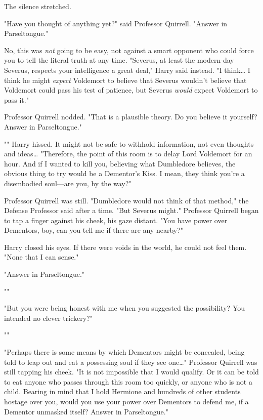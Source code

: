 The silence stretched.

"Have you thought of anything yet?" said Professor Quirrell. "Answer in
Parseltongue."

No, this was \emph{not} going to be easy, not against a smart opponent who
could force you to tell the literal truth at any time. "Severus, at least the
modern-day Severus, respects your intelligence a great deal," Harry said
instead. "I think{\ldots} I think he might \emph{expect} Voldemort to believe
that Severus wouldn't believe that Voldemort could pass his test of patience,
but Severus \emph{would} expect Voldemort to pass it."

Professor Quirrell nodded. "That is a plausible theory. Do you believe it
yourself? Answer in Parseltongue."

"" Harry hissed. It might not be safe to withhold information, not
even thoughts and ideas{\ldots} "Therefore, the point of this room is to delay
Lord Voldemort for an hour. And if I wanted to kill you, believing what
Dumbledore believes, the obvious thing to try would be a Dementor's Kiss. I
mean, they think you're a disembodied soul---are you, by the way?"

Professor Quirrell was still. "Dumbledore would not think of that method," the
Defense Professor said after a time. "But Severus might." Professor Quirrell
began to tap a finger against his cheek, his gaze distant. "You have power over
Dementors, boy, can you tell me if there are any nearby?"

Harry closed his eyes. If there were voids in the world, he could not feel
them. "None that I can sense."

"Answer in Parseltongue."

""

"But you were being honest with me when you suggested the possibility? You
intended no clever trickery?"

""

"Perhaps there is some means by which Dementors might be concealed, being told
to leap out and eat a possessing soul if they see one{\ldots}" Professor
Quirrell was still tapping his cheek. "It is not impossible that I would
qualify. Or it can be told to eat anyone who passes through this room too
quickly, or anyone who is not a child. Bearing in mind that I hold Hermione and
hundreds of other students hostage over you, would you use your power over
Dementors to defend me, if a Dementor unmasked itself? Answer in Parseltongue."

